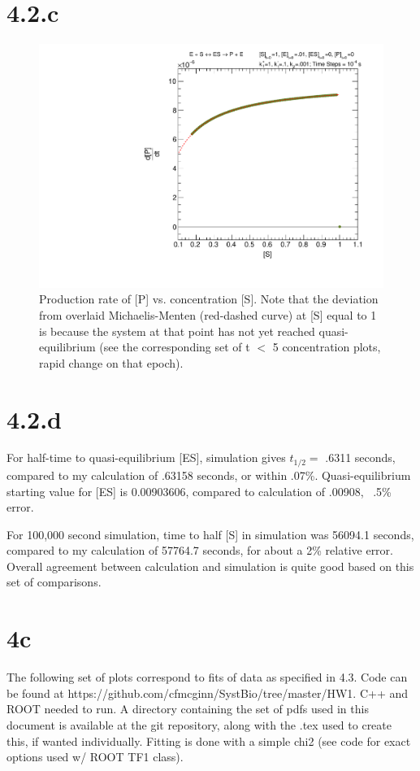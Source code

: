 \documentclass{article}
\begin{document}
\section{4.2.c}

\begin{figure}[H]
    \centering
    \includegraphics[width=.49\textwidth]{canv100k_PRate_c.pdf} 
    \caption{Production rate of [P] vs. concentration [S]. Note that the deviation from overlaid Michaelis-Menten (red-dashed curve) at [S] equal to 1 is because the system at that point has not yet reached quasi-equilibrium (see the corresponding set of t $<$ 5 concentration plots, rapid change on that epoch).}
    \label{}
\end{figure}

\section{4.2.d}
For half-time to quasi-equilibrium [ES], simulation gives $t_{1/2} = $ .6311 seconds, compared to my calculation of .63158 seconds, or within .07\%. Quasi-equilibrium starting value for [ES] is 0.00903606, compared to calculation of .00908, ~.5\% error.

For 100,000 second simulation, time to half [S] in simulation was 56094.1 seconds, compared to my calculation of 57764.7 seconds, for about a 2\% relative error. Overall agreement between calculation and simulation is quite good based on this set of comparisons.


\section{4c}
The following set of plots correspond to fits of data as specified in 4.3. Code can be found at https://github.com/cfmcginn/SystBio/tree/master/HW1. C++ and ROOT needed to run. A directory containing the set of pdfs used in this document is available at the git repository, along with the .tex used to create this, if wanted individually. Fitting is done with a simple chi2 (see code for exact options used w/ ROOT TF1 class). 
\end{document}
